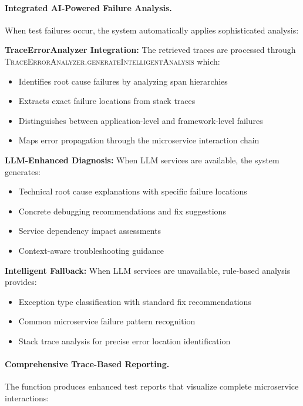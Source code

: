 \documentclass[conference]{IEEEtran}
\begin{document}
\paragraph{Integrated AI-Powered Failure Analysis.}
When test failures occur, the system automatically applies sophisticated analysis:

\textbf{TraceErrorAnalyzer Integration:} The retrieved traces are processed through \textsc{TraceErrorAnalyzer.generateIntelligentAnalysis} which:
\begin{itemize}[leftmargin=*]
  \item Identifies root cause failures by analyzing span hierarchies
  \item Extracts exact failure locations from stack traces
  \item Distinguishes between application-level and framework-level failures
  \item Maps error propagation through the microservice interaction chain
\end{itemize}

\textbf{LLM-Enhanced Diagnosis:} When LLM services are available, the system generates:
\begin{itemize}[leftmargin=*]
  \item Technical root cause explanations with specific failure locations
  \item Concrete debugging recommendations and fix suggestions
  \item Service dependency impact assessments
  \item Context-aware troubleshooting guidance
\end{itemize}

\textbf{Intelligent Fallback:} When LLM services are unavailable, rule-based analysis provides:
\begin{itemize}[leftmargin=*]
  \item Exception type classification with standard fix recommendations
  \item Common microservice failure pattern recognition
  \item Stack trace analysis for precise error location identification
\end{itemize}

\paragraph{Comprehensive Trace-Based Reporting.}
The  function produces enhanced test reports that visualize complete microservice interactions:
\end{document}
